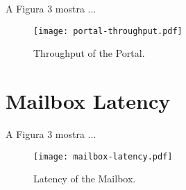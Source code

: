 		A Figura 3 mostra ...

		\begin{figure}[!tb]
			\centering%
			\caption{Throughput of the Portal.}%
			\label{fig:exp-portal}%
			\texttt{[image: portal-throughput.pdf]}%
		\end{figure}

	\section{Mailbox Latency}

		A Figura 3 mostra ...

		\begin{figure}[!tb]
			\centering%
			\caption{Latency of the Mailbox.}%
			\label{fig:exp-mailbox}%
			\texttt{[image: mailbox-latency.pdf]}%
		\end{figure}

